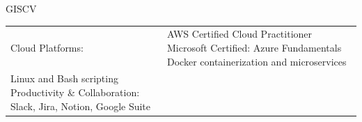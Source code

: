 \documentclass[letterpaper]{article}
\newenvironment{skillslist}
        {
            \hspace*{-0.07in}\begin{tabular}[t]{ l L{5.17in} }
        }{
            \end{tabular}
        }
\newcommand{\impt}[1]{\uline{#1}}
\begin{document}
\begin{taggedblock}{GISCV}
\begin{skillslist}
                \\
            Cloud Platforms:&
                AWS Certified Cloud Practitioner \linebreak
                Microsoft Certified: Azure Fundamentals \linebreak
                Docker containerization and microservices \linebreak
                \\
                Linux and Bash scripting \linebreak
                Productivity \& Collaboration: Slack, Jira, Notion, Google Suite \linebreak
                \\

\end{skillslist}
\end{taggedblock}
\end{document}
